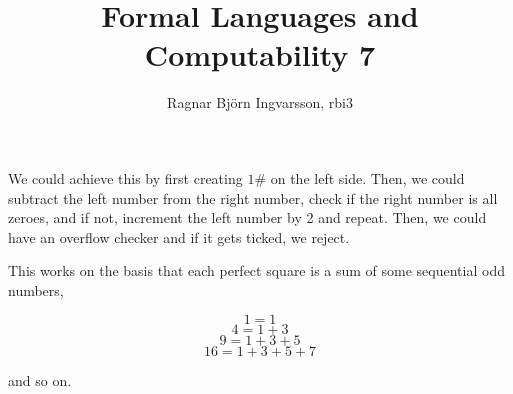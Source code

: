 \documentclass{article}
\title{Formal Languages and Computability 7}
\author{Ragnar Björn Ingvarsson, rbi3}
\begin{document}
\renewcommand\thepage{}
	
	\maketitle

	\newpage
	\setcounter{page}{1}
	\renewcommand\thepage{\arabic{page}}
	\setcounter{section}{2}

	\section{}
We could achieve this by first creating $1\#$ on the left side. 
Then, we could subtract the left number from the right number, check 
if the right number is all zeroes, and if not, increment the left number 
by 2 and repeat. Then, we could have an overflow checker and if it gets 
ticked, we reject.

This works on the basis that each perfect square is a sum of some 
sequential odd numbers,

\[1 = 1\]
\[4 = 1 + 3\]
\[9 = 1 + 3 + 5\]
\[16 = 1 + 3 + 5 + 7\]

and so on.
\end{document}
